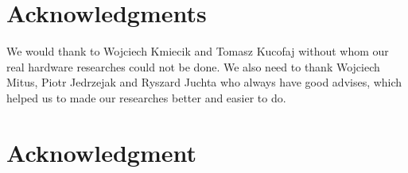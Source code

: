 \documentclass[conference,compsoc]{IEEEtran}
\begin{document}
%
\IEEEpeerreviewmaketitle





\ifCLASSOPTIONcompsoc
  \section*{Acknowledgments}
We would thank to Wojciech Kmiecik and Tomasz Kucofaj without whom our real hardware researches could not be done. We also need to thank Wojciech Mitus, Piotr Jedrzejak and Ryszard Juchta who always have good advises, which helped us to made our researches better and easier to do.
\else
  \section*{Acknowledgment}
\fi






\end{document}
